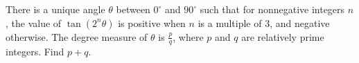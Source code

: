 There is a unique angle $\theta$ between $0^{\circ}$ and $90^{\circ}$ such that for nonnegative integers $n$, the value of $\tan{\left(2^{n}\theta\right)}$ is positive when $n$ is a multiple of $3$, and negative otherwise. The degree measure of $\theta$ is $\frac{p}{q}$, where $p$ and $q$ are relatively prime integers. Find $p+q$.